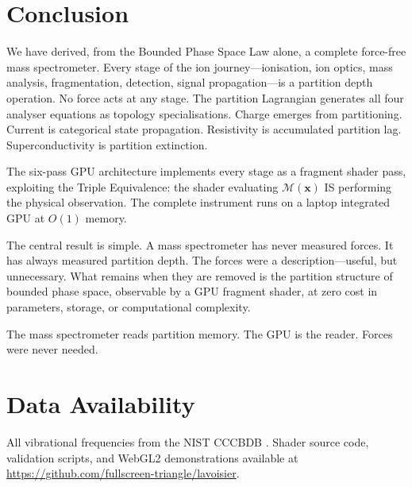 \documentclass[11pt,twocolumn,a4paper]{article}
\theoremstyle{definition}
\theoremstyle{remark}
\newcommand{\Depth}{\mathcal{M}}
\begin{document}
\section{Conclusion}
\label{sec:conclusion}

We have derived, from the Bounded Phase Space Law alone, a complete force-free mass spectrometer. Every stage of the ion journey---ionisation, ion optics, mass analysis, fragmentation, detection, signal propagation---is a partition depth operation. No force acts at any stage. The partition Lagrangian generates all four analyser equations as topology specialisations. Charge emerges from partitioning. Current is categorical state propagation. Resistivity is accumulated partition lag. Superconductivity is partition extinction.

The six-pass GPU architecture implements every stage as a fragment shader pass, exploiting the Triple Equivalence: the shader evaluating $\Depth(\mathbf{x})$ IS performing the physical observation. The complete instrument runs on a laptop integrated GPU at $O(1)$ memory.

The central result is simple. A mass spectrometer has never measured forces. It has always measured partition depth. The forces were a description---useful, but unnecessary. What remains when they are removed is the partition structure of bounded phase space, observable by a GPU fragment shader, at zero cost in parameters, storage, or computational complexity.

The mass spectrometer reads partition memory. The GPU is the reader. Forces were never needed.

\section*{Data Availability}

All vibrational frequencies from the NIST CCCBDB \citep{johnson2022}. Shader source code, validation scripts, and WebGL2 demonstrations available at \url{https://github.com/fullscreen-triangle/lavoisier}.



\end{document}
